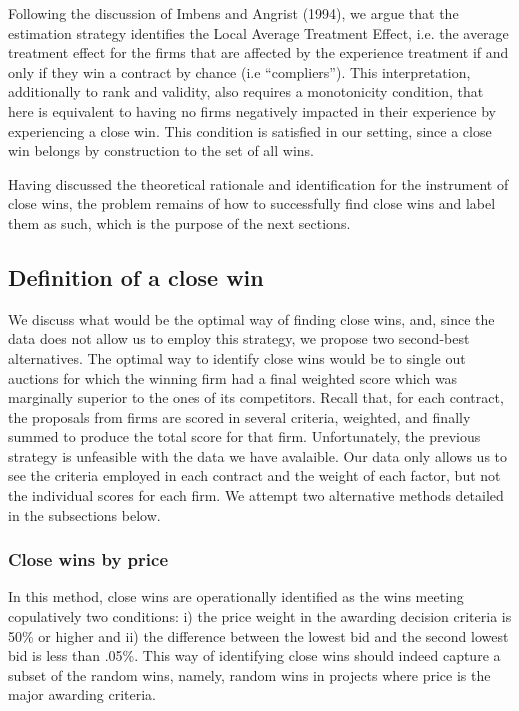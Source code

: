  Following the discussion of Imbens and Angrist (1994), we argue that the estimation strategy identifies the Local Average Treatment Effect, i.e. the average treatment effect for the firms that are affected by the experience treatment if and only if they win a contract by chance (i.e “compliers”). This interpretation, additionally to rank and validity, also requires a monotonicity condition, that here is equivalent to having no firms negatively impacted in their experience by experiencing a close win. This condition is satisfied in our setting, since a close win belongs by construction to the set of all wins.

Having discussed the theoretical rationale and identification for the instrument of close wins, the problem remains of how to successfully find close wins and label them as such, which is the purpose of the next sections.

\subsection{Definition of a close win}
We discuss what would be the optimal way of finding close wins, and, since the data does not allow us to employ this strategy, we propose two second-best alternatives.
The optimal way to identify close wins would be to single out auctions for which the winning firm had a final weighted score which was marginally superior to the ones of its competitors.  Recall that, for each contract, the  proposals from firms are scored in several criteria, weighted, and finally summed to produce the total score for that firm. Unfortunately, the previous strategy is unfeasible with the data we have avalaible. Our data only allows us to see the criteria employed in each contract and the weight of each factor, but not the individual scores for each firm. We attempt two alternative methods detailed in the subsections below.

\subsubsection{Close wins by price}
In this method, close wins are operationally identified as the wins meeting copulatively  two conditions: i) the price weight in the awarding decision criteria is 50\% or higher and ii) the difference between the lowest bid and the second lowest bid is less than .05\%. This way of identifying close wins should indeed capture a subset of the random wins, namely, random wins in projects where price is the major awarding criteria.


